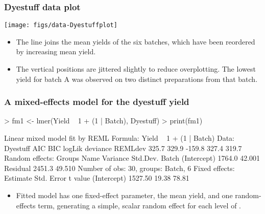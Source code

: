 \begin{frame}[fragile]
  \frametitle{Dyestuff data plot}
  \begin{center}
\texttt{[image: figs/data-Dyestuffplot]}
  \end{center}
  \begin{itemize}
  \item The line joins the mean yields of the six batches, which have
    been reordered by increasing mean yield.
  \item The vertical positions are jittered slightly to reduce
    overplotting.  The lowest yield for batch A was observed on two
    distinct preparations from that batch.
  \end{itemize}
\end{frame}

\begin{frame}[fragile]
  \frametitle{A mixed-effects model for the dyestuff yield}
\begin{Schunk}
\begin{Sinput}
> fm1 <- lmer(Yield ~ 1 + (1 | Batch), Dyestuff)
> print(fm1)
\end{Sinput}
\begin{Soutput}
Linear mixed model fit by REML 
Formula: Yield ~ 1 + (1 | Batch) 
   Data: Dyestuff 
   AIC   BIC logLik deviance REMLdev
 325.7 329.9 -159.8    327.4   319.7
Random effects:
 Groups   Name        Variance Std.Dev.
 Batch    (Intercept) 1764.0   42.001  
 Residual             2451.3   49.510  
Number of obs: 30, groups: Batch, 6
Fixed effects:
            Estimate Std. Error t value
(Intercept)  1527.50      19.38   78.81
\end{Soutput}
\end{Schunk}
\begin{itemize}
\item Fitted model  has one fixed-effect parameter, the mean
  yield, and one random-effects term, generating a simple, scalar
  random effect for each level of .
\end{itemize}
\end{frame}


